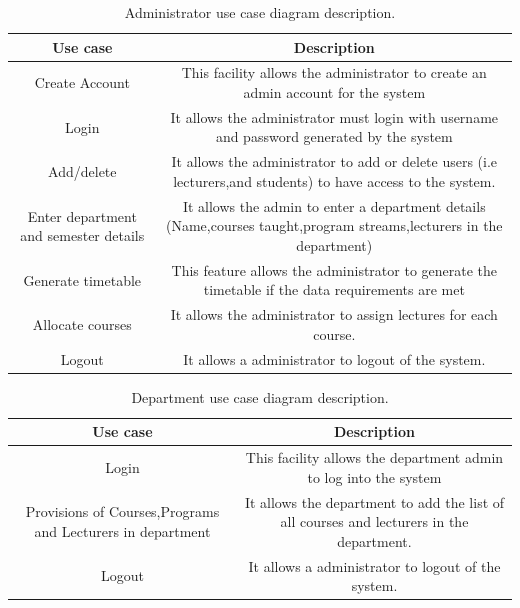 \documentclass{scrreprt}
\begin{document}
\begin{table}[h!]
  \begin{center}
    \caption{ Administrator use case diagram description.}
    \label{tab:table1}
    \begin{tabular}{|c|c|} 
\hline
      \textbf{Use case} & \textbf{Description} \\
 
      \hline
Create Account&This facility allows the administrator to create an admin account for the system\\
\hline
     Login& It allows the administrator must login with username and password generated by the system \\
\hline
      Add/delete  &  It allows the administrator to add or delete  users (i.e lecturers,and students) to have access  to the system.\\
\hline
Enter department and semester details& It allows the admin to enter a department details (Name,courses taught,program streams,lecturers in the department)\\
\hline
Generate timetable& This  feature allows the administrator to generate the timetable if the data requirements are met\\
\hline
       Allocate courses & It allows the administrator to assign lectures for each course.\\
 \hline
Logout&  It allows a administrator to logout of the system.\\
\hline
  \end{tabular}
  \end{center}
\end{table}

\begin{table}[h!]
  \begin{center}
    \caption{ Department use case diagram description.}
    \label{tab:table1}
    \begin{tabular}{|c|c|} 
\hline
      \textbf{Use case} & \textbf{Description} \\
 
      \hline
Login &This facility allows the department admin to log into the system\\
\hline
   Provisions of Courses,Programs and Lecturers in department& It allows the department  to add  the list of all courses and lecturers in the department.\\
\hline
      
Logout&  It allows a administrator to logout of the system.\\
\hline
  \end{tabular}
  \end{center}
\end{table}
\end{document}
